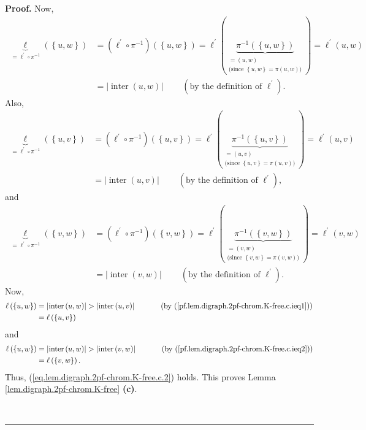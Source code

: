 \documentclass[numbers=enddot,12pt,final,onecolumn,notitlepage]{scrartcl}%
\theoremstyle{definition}
\newenvironment{proof}[1][Proof]{\noindent\textbf{#1.} }{\ \rule{0.5em}{0.5em}}
\newenvironment{verlong}{}{}
\begin{document}
\begin{verlong}
\begin{proof}
Now,%
\begin{align*}
\underbrace{\ell}_{=\ell^{\prime}\circ\pi^{-1}}\left(  \left\{  u,w\right\}
\right)   &  =\left(  \ell^{\prime}\circ\pi^{-1}\right)  \left(  \left\{
u,w\right\}  \right)  =\ell^{\prime}\left(  \underbrace{\pi^{-1}\left(
\left\{  u,w\right\}  \right)  }_{\substack{=\left(  u,w\right)
\\\text{(since }\left\{  u,w\right\}  =\pi\left(  u,w\right)  \text{)}%
}}\right)  =\ell^{\prime}\left(  u,w\right) \\
&  =\left\vert \operatorname*{inter}\left(  u,w\right)  \right\vert
\ \ \ \ \ \ \ \ \ \ \left(  \text{by the definition of }\ell^{\prime}\right)
.
\end{align*}
Also,%
\begin{align*}
\underbrace{\ell}_{=\ell^{\prime}\circ\pi^{-1}}\left(  \left\{  u,v\right\}
\right)   &  =\left(  \ell^{\prime}\circ\pi^{-1}\right)  \left(  \left\{
u,v\right\}  \right)  =\ell^{\prime}\left(  \underbrace{\pi^{-1}\left(
\left\{  u,v\right\}  \right)  }_{\substack{=\left(  u,v\right)
\\\text{(since }\left\{  u,v\right\}  =\pi\left(  u,v\right)  \text{)}%
}}\right)  =\ell^{\prime}\left(  u,v\right) \\
&  =\left\vert \operatorname*{inter}\left(  u,v\right)  \right\vert
\ \ \ \ \ \ \ \ \ \ \left(  \text{by the definition of }\ell^{\prime}\right)
,
\end{align*}
and%
\begin{align*}
\underbrace{\ell}_{=\ell^{\prime}\circ\pi^{-1}}\left(  \left\{  v,w\right\}
\right)   &  =\left(  \ell^{\prime}\circ\pi^{-1}\right)  \left(  \left\{
v,w\right\}  \right)  =\ell^{\prime}\left(  \underbrace{\pi^{-1}\left(
\left\{  v,w\right\}  \right)  }_{\substack{=\left(  v,w\right)
\\\text{(since }\left\{  v,w\right\}  =\pi\left(  v,w\right)  \text{)}%
}}\right)  =\ell^{\prime}\left(  v,w\right) \\
&  =\left\vert \operatorname*{inter}\left(  v,w\right)  \right\vert
\ \ \ \ \ \ \ \ \ \ \left(  \text{by the definition of }\ell^{\prime}\right)
.
\end{align*}
Now,%
\begin{align*}
\ell\left(  \left\{  u,w\right\}  \right)   &  =\left\vert
\operatorname*{inter}\left(  u,w\right)  \right\vert >\left\vert
\operatorname*{inter}\left(  u,v\right)  \right\vert
\ \ \ \ \ \ \ \ \ \ \left(  \text{by
(\ref{pf.lem.digraph.2pf-chrom.K-free.c.ieq1})}\right) \\
&  =\ell\left(  \left\{  u,v\right\}  \right)
\end{align*}
and%
\begin{align*}
\ell\left(  \left\{  u,w\right\}  \right)   &  =\left\vert
\operatorname*{inter}\left(  u,w\right)  \right\vert >\left\vert
\operatorname*{inter}\left(  v,w\right)  \right\vert
\ \ \ \ \ \ \ \ \ \ \left(  \text{by
(\ref{pf.lem.digraph.2pf-chrom.K-free.c.ieq2})}\right) \\
&  =\ell\left(  \left\{  v,w\right\}  \right)  .
\end{align*}
Thus, (\ref{eq.lem.digraph.2pf-chrom.K-free.c.2}) holds. This proves Lemma
\ref{lem.digraph.2pf-chrom.K-free} \textbf{(c)}.


\end{proof}
\end{verlong}
\end{document}
